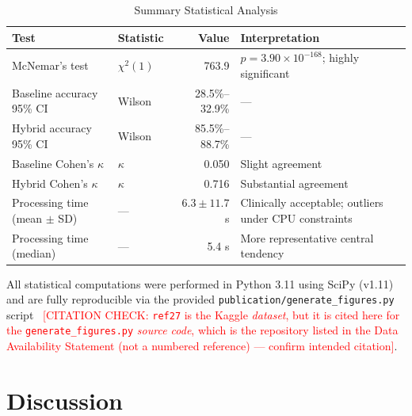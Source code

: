 \documentclass[12pt,a4paper]{article}
\begin{document}
\begin{table}[H]
\centering
\caption{Summary Statistical Analysis}
\label{tab:statsummary}
\begin{tabular}{@{}llrl@{}}
\toprule
\textbf{Test} & \textbf{Statistic} & \textbf{Value} & \textbf{Interpretation} \\
\midrule
McNemar's test           & $\chi^2(1)$  & 763.9     & $p = 3.90 \times 10^{-168}$; highly significant \\
Baseline accuracy 95\% CI & Wilson      & 28.5\%--32.9\% & --- \\
Hybrid accuracy 95\% CI   & Wilson      & 85.5\%--88.7\% & --- \\
Baseline Cohen's $\kappa$ & $\kappa$    & 0.050     & Slight agreement \\
Hybrid Cohen's $\kappa$   & $\kappa$    & 0.716     & Substantial agreement \\
Processing time (mean $\pm$ SD) & ---   & $6.3 \pm 11.7$ s & Clinically acceptable; outliers under CPU constraints \\
Processing time (median)  & ---         & 5.4 s     & More representative central tendency \\
\bottomrule
\end{tabular}
\end{table}

All statistical computations were performed in Python 3.11 using SciPy (v1.11) and are fully reproducible via the provided \texttt{publication/generate\_figures.py} script \cite{ref27}\textcolor{red}{~[CITATION CHECK: \texttt{ref27} is the Kaggle \emph{dataset}, but it is cited here for the \texttt{generate\_figures.py} \emph{source code}, which is the repository listed in the Data Availability Statement (not a numbered reference) --- confirm intended citation]}.

\section{Discussion}
\label{sec:discussion}
\end{document}
